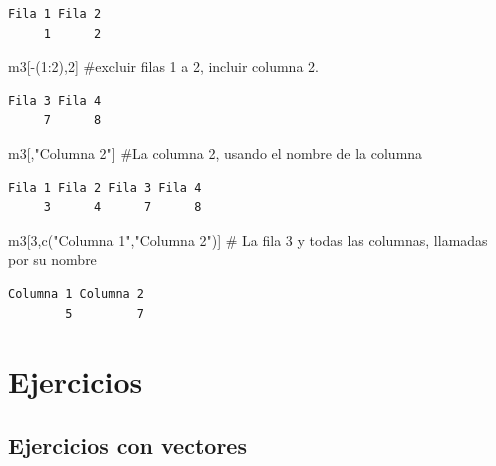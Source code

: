 \documentclass[
  letterpaper,
]{scrbook}
\newenvironment{Shaded}{\begin{snugshade}}{\end{snugshade}}
\newcommand{\CommentTok}[1]{\textcolor[rgb]{0.37,0.37,0.37}{#1}}
\newcommand{\DecValTok}[1]{\textcolor[rgb]{0.68,0.00,0.00}{#1}}
\newcommand{\FunctionTok}[1]{\textcolor[rgb]{0.28,0.35,0.67}{#1}}
\newcommand{\NormalTok}[1]{\textcolor[rgb]{0.00,0.23,0.31}{#1}}
\newcommand{\SpecialCharTok}[1]{\textcolor[rgb]{0.37,0.37,0.37}{#1}}
\newcommand{\StringTok}[1]{\textcolor[rgb]{0.13,0.47,0.30}{#1}}
\begin{document}
\begin{verbatim}
Fila 1 Fila 2 
     1      2 
\end{verbatim}

\begin{Shaded}
\begin{Highlighting}[]
\NormalTok{m3[}\SpecialCharTok{{-}}\NormalTok{(}\DecValTok{1}\SpecialCharTok{:}\DecValTok{2}\NormalTok{),}\DecValTok{2}\NormalTok{] }\CommentTok{\#excluir filas 1 a 2, incluir columna 2.}
\end{Highlighting}
\end{Shaded}

\begin{verbatim}
Fila 3 Fila 4 
     7      8 
\end{verbatim}

\begin{Shaded}
\begin{Highlighting}[]
\NormalTok{m3[,}\StringTok{"Columna 2"}\NormalTok{] }\CommentTok{\#La columna 2, usando el nombre de la columna}
\end{Highlighting}
\end{Shaded}

\begin{verbatim}
Fila 1 Fila 2 Fila 3 Fila 4 
     3      4      7      8 
\end{verbatim}

\begin{Shaded}
\begin{Highlighting}[]
\NormalTok{m3[}\DecValTok{3}\NormalTok{,}\FunctionTok{c}\NormalTok{(}\StringTok{"Columna 1"}\NormalTok{,}\StringTok{"Columna 2"}\NormalTok{)] }\CommentTok{\# La fila 3 y todas las columnas, llamadas por su nombre}
\end{Highlighting}
\end{Shaded}

\begin{verbatim}
Columna 1 Columna 2 
        5         7 
\end{verbatim}

\hypertarget{ejercicios}{%
\section{Ejercicios}\label{ejercicios}}

\hypertarget{ejercicios-con-vectores}{%
\subsection{Ejercicios con vectores}\label{ejercicios-con-vectores}}
\end{document}
